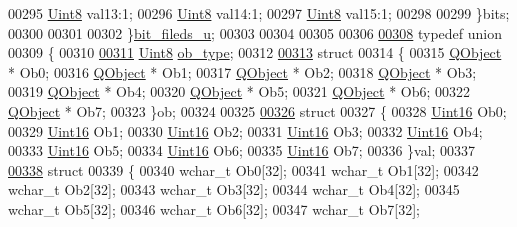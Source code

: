 \begin{DoxyCode}
00295         \hyperlink{a00004_a979e3e23b9a449e69ab6a8a83b6042f8}{Uint8} val13:1;
00296         \hyperlink{a00004_a979e3e23b9a449e69ab6a8a83b6042f8}{Uint8} val14:1;
00297         \hyperlink{a00004_a979e3e23b9a449e69ab6a8a83b6042f8}{Uint8} val15:1;
00298 
00299     \}bits;
00300 
00301 
00302 \}\hyperlink{a00004_d9/db6/a00146}{bit\_fileds\_u};
00303 
00304 
00305 
00306 
\hypertarget{a00004_source_l00308}{}\hyperlink{a00004}{00308} \textcolor{keyword}{typedef} \textcolor{keyword}{union}
00309 \{
00310 
\hypertarget{a00004_source_l00311}{}\hyperlink{a00004_a3fd4fa69deb9b5e8697df532f7929160}{00311}     \hyperlink{a00004_a979e3e23b9a449e69ab6a8a83b6042f8}{Uint8} \hyperlink{a00004_a3fd4fa69deb9b5e8697df532f7929160}{ob\_type};
00312 
\hypertarget{a00004_source_l00313}{}\hyperlink{a00004}{00313}     \textcolor{keyword}{struct}
00314       \{
00315           \hyperlink{a00059}{QObject} * Ob0;
00316           \hyperlink{a00059}{QObject} * Ob1;
00317           \hyperlink{a00059}{QObject} * Ob2;
00318           \hyperlink{a00059}{QObject} * Ob3;
00319           \hyperlink{a00059}{QObject} * Ob4;
00320           \hyperlink{a00059}{QObject} * Ob5;
00321           \hyperlink{a00059}{QObject} * Ob6;
00322           \hyperlink{a00059}{QObject} * Ob7;
00323       \}ob;
00324 
00325 
\hypertarget{a00004_source_l00326}{}\hyperlink{a00004}{00326}     \textcolor{keyword}{struct}
00327     \{
00328         \hyperlink{a00004_aae7407b021d43f7193a81a58cfb3e297}{Uint16}  Ob0;
00329         \hyperlink{a00004_aae7407b021d43f7193a81a58cfb3e297}{Uint16}  Ob1;
00330         \hyperlink{a00004_aae7407b021d43f7193a81a58cfb3e297}{Uint16}  Ob2;
00331         \hyperlink{a00004_aae7407b021d43f7193a81a58cfb3e297}{Uint16}  Ob3;
00332         \hyperlink{a00004_aae7407b021d43f7193a81a58cfb3e297}{Uint16}  Ob4;
00333         \hyperlink{a00004_aae7407b021d43f7193a81a58cfb3e297}{Uint16}  Ob5;
00334         \hyperlink{a00004_aae7407b021d43f7193a81a58cfb3e297}{Uint16}  Ob6;
00335         \hyperlink{a00004_aae7407b021d43f7193a81a58cfb3e297}{Uint16}  Ob7;
00336     \}val;
00337 
\hypertarget{a00004_source_l00338}{}\hyperlink{a00004}{00338}     \textcolor{keyword}{struct}
00339     \{
00340         \textcolor{keywordtype}{wchar\_t}  Ob0[32];
00341         \textcolor{keywordtype}{wchar\_t}  Ob1[32];
00342         \textcolor{keywordtype}{wchar\_t}  Ob2[32];
00343         \textcolor{keywordtype}{wchar\_t}  Ob3[32];
00344         \textcolor{keywordtype}{wchar\_t}  Ob4[32];
00345         \textcolor{keywordtype}{wchar\_t}  Ob5[32];
00346         \textcolor{keywordtype}{wchar\_t}  Ob6[32];
00347         \textcolor{keywordtype}{wchar\_t}  Ob7[32];

\end{DoxyCode}
